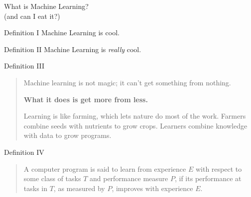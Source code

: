 
\begin{frame}
  \centering
  \vspace{0.4cm}
  {\huge \color{orange} What is Machine Learning?}\\
  \vspace{0.2cm}
  \pause
  {\small (and can I eat it?)}
\end{frame}

\begin{slide}{Definition I}
  \centering
  \Large
  \pause
  Machine Learning is cool.
\end{slide}

\begin{slide}{Definition II}
  \centering
  \Large
  Machine Learning is \emph{really} cool.
\end{slide}

\begin{slide}{Definition III}
  \begin{quote}
    \pause
    Machine learning is not magic; it can't get something from nothing.
    \pause
    \vspace{0.5cm}\\
    \begin{center}\textbf{What it does is get more from less.}\end{center}
    \vspace{0.5cm}
    \pause
    Learning is like farming, which lets nature do most of the work.
    Farmers combine seeds with nutrients to grow crops.
    Learners combine knowledge with data to grow programs.
  \end{quote}
  \cite{domingos2012}
\end{slide}

\begin{slide}{Definition IV}
\begin{quote}
  A computer program is said to learn from experience $E$ with respect to some class of tasks $T$ and performance measure $P$, if its performance at tasks in $T$, as measured by $P$, improves with experience $E$.
\end{quote}
\cite{mitchell1997}
\end{slide}

